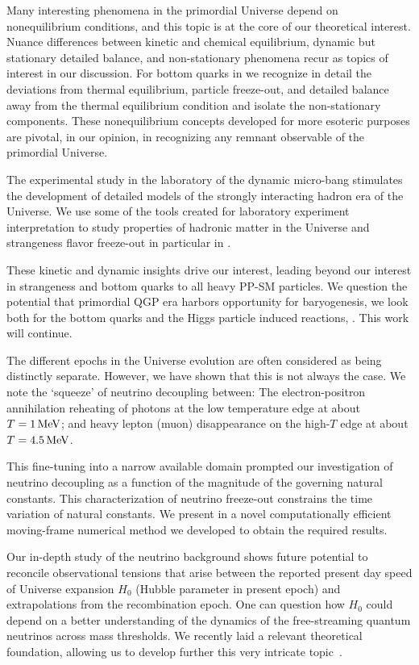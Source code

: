Many interesting phenomena in the primordial Universe depend on nonequilibrium conditions, and this topic is at the core of our theoretical interest. Nuance differences between kinetic and chemical equilibrium, dynamic but stationary detailed balance, and non-stationary phenomena recur as topics of interest in our discussion. For bottom quarks in  we recognize in detail the deviations from thermal equilibrium, particle freeze-out, and detailed balance away from the thermal equilibrium condition and isolate the non-stationary components. These nonequilibrium concepts developed for more esoteric purposes are pivotal, in our opinion, in recognizing any remnant observable of the primordial Universe. 

The experimental study in the laboratory of the dynamic micro-bang stimulates the development of detailed models of the strongly interacting hadron era of the Universe. We use some of the tools created for laboratory experiment interpretation to study properties of hadronic matter in the Universe and strangeness flavor freeze-out in particular in . 

These kinetic and dynamic insights drive our interest, leading beyond our interest in strangeness and bottom quarks to all heavy PP-SM particles. We question the potential that primordial QGP era harbors opportunity for baryogenesis, we look both for the bottom quarks and the Higgs particle induced reactions, . This work will continue.

The different epochs in the Universe evolution are often considered as being distinctly separate. However, we have shown that this is not always the case. We note the `squeeze' of neutrino decoupling between: The electron-positron annihilation reheating of photons at the low temperature edge at about $T=1\text{\,MeV}$; and heavy lepton (muon) disappearance on the high-$T$ edge at about $T=4.5\text{\,MeV}$. 

This fine-tuning into a narrow available domain prompted our investigation of neutrino decoupling as a function of the magnitude of the governing natural constants. This characterization of neutrino freeze-out constrains the time variation of natural constants. We present in  a novel computationally efficient moving-frame numerical method we developed to obtain the required results.

Our in-depth study of the neutrino background shows future potential to reconcile observational tensions that arise between the reported present day speed of Universe expansion $H_0$ (Hubble parameter in present epoch) and extrapolations from the recombination epoch. One can question how $H_0$ could depend on a better understanding of the dynamics of the free-streaming quantum neutrinos across mass thresholds. We recently laid a relevant theoretical foundation, allowing us to develop further this very intricate topic~\cite{Birrell:2024bdb}.

